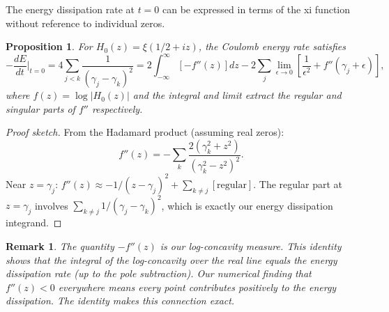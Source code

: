 \documentclass[11pt,a4paper]{article}
\newtheorem{proposition}{Proposition}
\newtheorem{remark}{Remark}
\begin{document}
The energy dissipation rate at $t = 0$ can be expressed in
terms of the xi function without reference to individual zeros.

\begin{proposition}
  For $H_0(z) = \xi(1/2+iz)$, the Coulomb energy rate satisfies
  \begin{equation}\label{eq:xi-identity}
    -\frac{dE}{dt}\bigg|_{t=0}
    = 4\sum_{j<k}\frac{1}{(\gamma_j - \gamma_k)^2}
    = 2\int_{-\infty}^{\infty} \left[-f''(z)\right] dz
    - 2\sum_j \lim_{\epsilon \to 0}
      \left[\frac{1}{\epsilon^2} + f''(\gamma_j + \epsilon)\right],
  \end{equation}
  where $f(z) = \log|H_0(z)|$ and the integral and limit extract
  the regular and singular parts of $f''$ respectively.
\end{proposition}

\begin{proof}[Proof sketch]
  From the Hadamard product (assuming real zeros):
  \[
    f''(z) = -\sum_k \frac{2(\gamma_k^2 + z^2)}{(\gamma_k^2 - z^2)^2}.
  \]
  Near $z = \gamma_j$: $f''(z) \approx -1/(z-\gamma_j)^2
  + \sum_{k \neq j} [\text{regular}]$. The regular part at
  $z = \gamma_j$ involves $\sum_{k \neq j} 1/(\gamma_j-\gamma_k)^2$,
  which is exactly our energy dissipation integrand.
\end{proof}

\begin{remark}
  The quantity $-f''(z)$ is our log-concavity measure. This
  identity shows that the \emph{integral} of the log-concavity
  over the real line equals the energy dissipation rate (up to
  the pole subtraction). Our numerical finding that $f''(z) < 0$
  everywhere means every point contributes positively to the
  energy dissipation. The identity makes this connection exact.
\end{remark}
\end{document}
